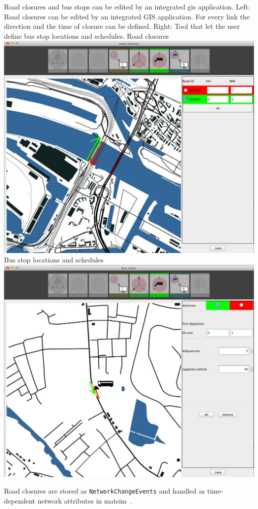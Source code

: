 \createfigure%
{Road closures and bus stops can be edited by an integrated \protect\gls{gis} application.}%
{Left: Road closures can be edited by an integrated GIS application. For every link the direction and the time of closure can be defined. Right: Tool that let the user define bus stop locations and schedules.}%
{\label{fig:evac_editor}}%
{%
  \createsubfigure%
  {Road closures}%
{\includegraphics[width=.475\linewidth]{extending/figures/Evacuation/rd_closure_detail}}
  {}%
  {}%
  \createsubfigure%
  {Bus stop locations and schedules}%
{\includegraphics[width=.475\linewidth]{extending/figures/Evacuation/bus_stops}}
  {}%
  {}%
}%
  {}%

Road closures are stored as \lstinline|NetworkChangeEvents| and handled as time-dependent network attributes in \gls{matsim}~\citep{LaemmelGretherNagel2009TimeDependentNetworks}.

